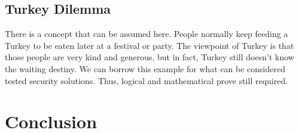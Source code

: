 \documentclass[journal]{IEEEtran}
\begin{document}
\subsection{Turkey Dilemma}
There is a concept that can be assumed here. People normally keep feeding a Turkey to be eaten later at
a festival or party. The viewpoint of Turkey is that those people are very kind and generous, but in fact,
Turkey still doesn't know the waiting destiny. We can borrow this example for what can be considered tested
security solutions. Thus, logical and mathematical prove still required.
\section{Conclusion}





\end{document}
